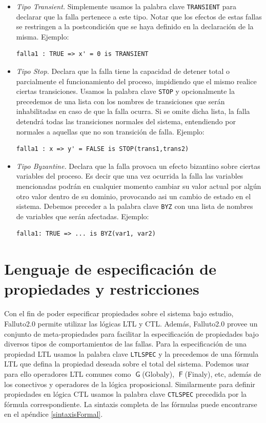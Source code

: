 \documentclass[pdftex,a4paper,12pt]{book}
\newcommand{\G}{\mathop{\mathsf{G}}}
\newcommand{\F}{\mathop{\mathsf{F}}}
\begin{document}
\begin{itemize}
\item \textit{Tipo Transient.} Simplemente usamos la palabra clave \texttt{TRANSIENT} para declarar que la falla pertenece a este tipo. Notar que los efectos de estas fallas se restringen a la postcondici\'on que se haya definido en la declaraci\'on de la misma. Ejemplo: \begin{verbatim}falla1 : TRUE => x' = 0 is TRANSIENT\end{verbatim}
\item \textit{Tipo Stop.} Declara que la falla tiene la capacidad de detener total o parcialmente el funcionamiento del proceso, impidiendo que el mismo realice ciertas transiciones. Usamos la palabra clave \texttt{STOP} y opcionalmente la precedemos de una lista con los nombres de transiciones que ser\'an inhabilitadas en caso de que la falla ocurra. Si se omite dicha lista, la falla detendr\'a todas las transiciones normales del sistema, entendiendo por normales a aquellas que no son transici\'on de falla. Ejemplo: \begin{verbatim}falla1 : x => y' = FALSE is STOP(trans1,trans2) \end{verbatim}
\item \textit{Tipo Byzantine.} Declara que la falla provoca un efecto bizantino sobre ciertas variables del proceso. Es decir que una vez ocurrida la falla las variables mencionadas podr\'an en cualquier momento cambiar su valor actual por alg\'un otro valor dentro de su dominio, provocando asi un cambio de estado en el sistema. Debemos preceder a la palabra clave \texttt{BYZ} con una lista de nombres de variables que ser\'an afectadas. Ejemplo: \begin{verbatim}falla1: TRUE => ... is BYZ(var1, var2) \end{verbatim}
\end{itemize}

\section{Lenguaje de especificaci\'on de propiedades y restricciones}

Con el fin de poder especificar propiedades sobre el sistema bajo estudio, Falluto2.0 permite utilizar las l\'ogicas LTL y CTL. Adem\'as, Falluto2.0 provee un conjunto de meta-propiedades para facilitar la especificaci\'on de propiedades bajo diversos tipos de comportamientos de las fallas.
Para la especificaci\'on de una propiedad LTL usamos la palabra clave \texttt{LTLSPEC} y la precedemos de una f\'ormula LTL que defina la propiedad deseada sobre el total del sistema. Podemos usar para ello operadores LTL comunes como $\G$(Globaly), $\F$(Finaly), etc, adem\'as de los conectivos y operadores de la l\'ogica proposicional. Similarmente para definir propiedades en l\'ogica CTL usamos la palabra clave \texttt{CTLSPEC} precedida por la f\'ormula correspondiente. La sintaxis completa de las f\'ormulas puede encontrarse en el ap\'endice \ref{sintaxisFormal}.
\end{document}
